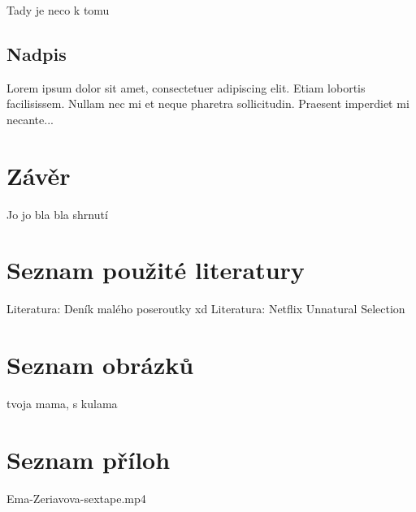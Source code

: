 \documentclass[a4paper,12pt,oneside]{book}
\begin{document}
Tady je neco k tomu

\section{Nadpis}

Lorem ipsum dolor sit amet, consectetuer adipiscing elit.
Etiam lobortis facilisissem.  Nullam nec mi et neque pharetra
sollicitudin.  Praesent imperdiet mi necante...

\chapter{Závěr}
\thispagestyle{fancy}

Jo jo bla bla shrnutí

\chapter{Seznam použité literatury}
\thispagestyle{fancy}

Literatura: Deník malého poseroutky xd
Literatura: Netflix Unnatural Selection

\chapter{Seznam obrázků}
\thispagestyle{fancy}

tvoja mama, s kulama

\chapter{Seznam příloh}
\thispagestyle{fancy}

Ema-Zeriavova-sextape.mp4
\end{document}
